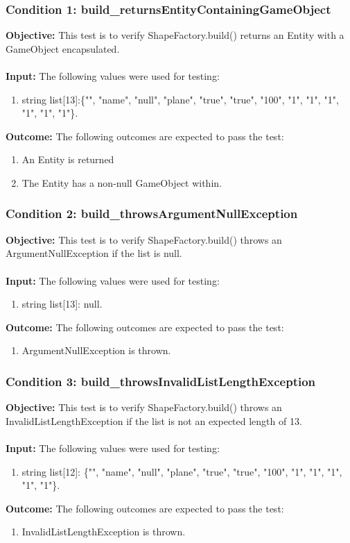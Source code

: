 \documentclass[a4paper,12pt]{article}
\begin{document}
		\subsubsection{Condition 1: build\_returnsEntityContainingGameObject}
			\textbf{Objective:} This test is to verify ShapeFactory.build() returns an Entity with a GameObject encapsulated.\\\\
			\textbf{Input:} The following values were used for testing:
				\begin{enumerate}
					\item string list[13]:\{"", "name", "null", "plane", "true", "true", "100", "1", "1", "1", "1", "1", "1"\}.
				\end{enumerate}
			\textbf{Outcome:} The following outcomes are expected to pass the test:
				\begin{enumerate}
					\item An Entity is returned
					\item The Entity has a non-null GameObject within.
				\end{enumerate}
		\subsubsection{Condition 2: build\_throwsArgumentNullException}
			\textbf{Objective:} This test is to verify ShapeFactory.build() throws an ArgumentNullException if the list is null.\\\\
			\textbf{Input:} The following values were used for testing:
				\begin{enumerate}
					\item string list[13]: null.
				\end{enumerate}
			\textbf{Outcome:} The following outcomes are expected to pass the test:
				\begin{enumerate}
					\item ArgumentNullException is thrown.
				\end{enumerate}
		\subsubsection{Condition 3: build\_throwsInvalidListLengthException}
			\textbf{Objective:} This test is to verify ShapeFactory.build() throws an InvalidListLengthException if the list is not an expected length of 13.\\\\
			\textbf{Input:} The following values were used for testing:
				\begin{enumerate}
					\item string list[12]: \{"", "name", "null", "plane", "true", "true", "100", "1", "1", "1", "1", "1"\}.
				\end{enumerate}
			\textbf{Outcome:} The following outcomes are expected to pass the test:
				\begin{enumerate}
					\item InvalidListLengthException is thrown.
				\end{enumerate}
\end{document}
